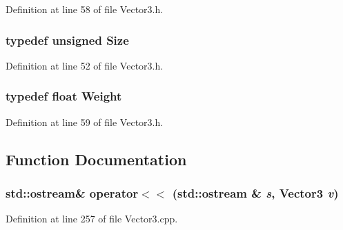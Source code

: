 Definition at line 58 of file Vector3.h.

\subsubsection[{Size}]{\setlength{\rightskip}{0pt plus 5cm}typedef unsigned {\bf Size}}\label{Vector3_8h_a772b762114e74538c967388931c4a5e9}


Definition at line 52 of file Vector3.h.

\subsubsection[{Weight}]{\setlength{\rightskip}{0pt plus 5cm}typedef float {\bf Weight}}\label{Vector3_8h_ad8909b856fa70c7731c787994276fb03}


Definition at line 59 of file Vector3.h.



\subsection{Function Documentation}
\subsubsection[{operator$<$$<$}]{\setlength{\rightskip}{0pt plus 5cm}std::ostream\& operator$<$$<$ (std::ostream \& {\em s}, \/  {\bf Vector3} {\em v})}\label{Vector3_8h_a751d7222f22f7264709359319164fdcd}


Definition at line 257 of file Vector3.cpp.

